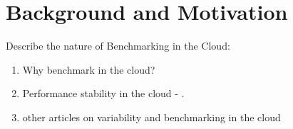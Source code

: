 \chapter{Background and Motivation}
\label{chap:background}

Describe the nature of Benchmarking in the Cloud:

\begin{enumerate}
    \item Why benchmark in the cloud?
    \item Performance stability in the cloud - \citet{laaber2019software}.
    \item other articles on variability and benchmarking in the cloud
\end{enumerate}
